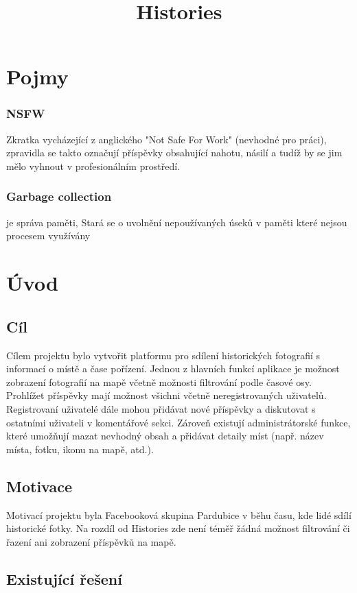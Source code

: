 \documentclass[12pt, a4paper,
 twoside,        %
 openright
]{report}
\title{Histories} %
\author{\name} %
\date{\publicationYear} %
\begin{document}
\pagestyle{empty}



\chapter{Pojmy}
\subsection{NSFW}
Zkratka vycházející z anglického "Not Safe For Work" (nevhodné pro práci), zpravidla se takto označují příspěvky obsahující nahotu, násilí a tudíž by se jim mělo vyhnout v profesionálním prostředí.
\subsection{Garbage collection} je správa paměti, Stará se o uvolnění nepoužívaných úseků v paměti které nejsou procesem využívány

\chapter{Úvod}
\section{Cíl}
Cílem projektu bylo vytvořit platformu pro sdílení historických fotografií
s informací o místě a čase pořízení. Jednou z hlavních funkcí aplikace je možnost
zobrazení fotografií na mapě včetně možnosti filtrování podle časové osy. Prohlížet 
příspěvky mají možnost všichni včetně neregistrovaných uživatelů. Registrovaní 
uživatelé dále mohou přidávat nové příspěvky a diskutovat s ostatními uživateli v
komentářové sekci. Zároveň existují administrátorské funkce, které umožňují mazat
nevhodný obsah a přidávat detaily míst (např. název místa, fotku, ikonu na mapě, atd.).

\section{Motivace}
Motivací projektu byla Facebooková skupina Pardubice v běhu času\cite{PardubiceVBehuCasuFB}, kde lidé 
sdílí historické fotky. Na rozdíl od Histories zde není téměř žádná možnost filtrování či 
řazení ani zobrazení příspěvků na mapě.




\section{Existující řešení}
\end{document}
